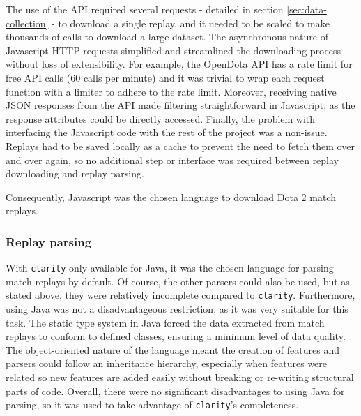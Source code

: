 \documentclass[Report.tex]{subfiles}
\begin{document}
The use of the API required several requests - detailed in section \ref{sec:data-collection} - to download a single replay, and it needed to be scaled to make thousands of calls to download a large dataset. The asynchronous nature of Javascript HTTP requests simplified and streamlined the downloading process without loss of extensibility. For example, the OpenDota API has a rate limit for free API calls (60 calls per minute) and it was trivial to wrap each request function with a limiter to adhere to the rate limit. Moreover, receiving native JSON responses from the API made filtering straightforward in Javascript, as the response attributes could be directly accessed. Finally, the problem with interfacing the Javascript code with the rest of the project was a non-issue. Replays had to be saved locally as a cache to prevent the need to fetch them over and over again, so no additional step or interface was required between replay downloading and replay parsing. 

Consequently, Javascript was the chosen language to download Dota 2 match replays. 

\subsubsection{Replay parsing}
With \texttt{clarity} only available for Java, it was the chosen language for parsing match replays by default. Of course, the other parsers could also be used, but as stated above, they were relatively incomplete compared to \texttt{clarity}. Furthermore, using Java was not a disadvantageous restriction, as it was very suitable for this task. The static type system in Java forced the data extracted from match replays to conform to defined classes, ensuring a minimum level of data quality. The object-oriented nature of the language meant the creation of features and parsers could follow an inheritance hierarchy, especially when features were related so new features are added easily without breaking or re-writing structural parts of code. Overall, there were no significant disadvantages to using Java for parsing, so it was used to take advantage of \texttt{clarity}'s completeness.
\end{document}
